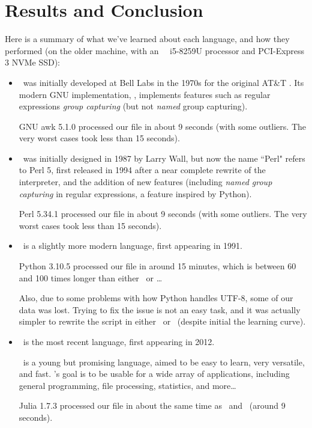 
\renewcommand{\currentPart}{Results and Conclusion}

\newpage
\part{Results and Conclusion}

Here is a summary of what we've learned about each language, and how they performed (on the older machine, with an \Intel\ \Core~i5-8259U processor and PCI-Express 3 NVMe SSD):

\begin{itemize}
	\item \awk\ was initially developed at Bell Labs in the 1970s for the original AT\&T \Unix.	
	Its modern GNU implementation, \gawk, implements features such as regular expressions \emph{group capturing} (but not \emph{named} group capturing).
	
	GNU awk 5.1.0 processed our file in about 9 seconds (with some outliers. The very worst cases took less than 15 seconds). \\
	
	\item \perl\ was initially designed in 1987 by Larry Wall, but now the name ``Perl" refers to Perl 5, first released in 1994 after a near complete rewrite of the interpreter, and the addition of new features (including \emph{named group capturing} in regular expressions, a feature inspired by Python).
	
	Perl 5.34.1 processed our file in about 9 seconds (with some outliers. The very worst cases took less than 15 seconds). \\
	
	
	\item \python\ is a slightly more modern language, first appearing in 1991. 
	
	Python 3.10.5 processed our file in around 15 minutes, which is between 60 and 100 times longer than either \gawk\ or \perl\dots
	
	Also, due to some problems with how Python handles UTF-8, some of our data was lost. Trying to fix the issue is not an easy task, and it was actually simpler to rewrite the script in either \gawk\ or \perl\ (despite initial the learning curve).
	
	
	\item \julia\ is the most recent language, first appearing in 2012.
	 
	 \julia\ is a young but promising language, aimed to be easy to learn, very versatile, and fast. \julia's goal is to be usable for a wide array of applications, including general programming, file processing, statistics, and more\dots
	 
	 Julia 1.7.3 processed our file in about the same time as \awk\ and \perl\ (around 9 seconds). \\
	 
\end{itemize}


